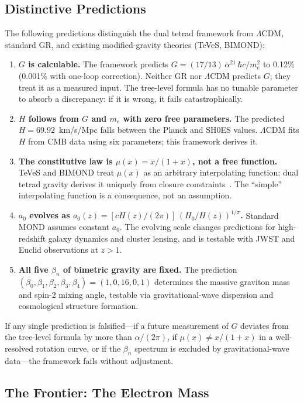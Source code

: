 \documentclass[aps,prd,preprint,superscriptaddress,showpacs,preprintnumbers,amsmath,amssymb,nofootinbib]{revtex4-2}
\begin{document}
\subsection{Distinctive Predictions}
\label{subsec:predictions}

The following predictions distinguish the dual tetrad framework from $\Lambda$CDM, standard GR, and existing modified-gravity theories (TeVeS, BIMOND):
\begin{enumerate}[leftmargin=2em]
\item \textbf{$G$ is calculable.} The framework predicts $G = (17/13)\,\alpha^{21}\,\hbar c/m_e^2$ to 0.12\% (0.001\% with one-loop correction). Neither GR nor $\Lambda$CDM predicts $G$; they treat it as a measured input. The tree-level formula has no tunable parameter to absorb a discrepancy: if it is wrong, it fails catastrophically.
\item \textbf{$H$ follows from $G$ and $m_e$ with zero free parameters.} The predicted $H = 69.92$~km/s/Mpc falls between the Planck and SH0ES values. $\Lambda$CDM fits $H$ from CMB data using six parameters; this framework derives it.
\item \textbf{The constitutive law is $\mu(x) = x/(1+x)$, not a free function.} TeVeS and BIMOND treat $\mu(x)$ as an arbitrary interpolating function; dual tetrad gravity derives it uniquely from closure constraints~\cite{paper1}. The ``simple'' interpolating function is a consequence, not an assumption.
\item \textbf{$a_0$ evolves as $a_0(z) = [cH(z)/(2\pi)]\,(H_0/H(z))^{1/\pi}$.} Standard MOND assumes constant $a_0$. The evolving scale changes predictions for high-redshift galaxy dynamics and cluster lensing, and is testable with JWST and Euclid observations at $z > 1$.
\item \textbf{All five $\beta_n$ of bimetric gravity are fixed.} The prediction $(\beta_0,\beta_1,\beta_2,\beta_3,\beta_4) = (1,0,16,0,1)$ determines the massive graviton mass and spin-2 mixing angle, testable via gravitational-wave dispersion and cosmological structure formation.
\end{enumerate}
If any single prediction is falsified---if a future measurement of $G$ deviates from the tree-level formula by more than $\alpha/(2\pi)$, if $\mu(x) \neq x/(1+x)$ in a well-resolved rotation curve, or if the $\beta_n$ spectrum is excluded by gravitational-wave data---the framework fails without adjustment.

\subsection{The Frontier: The Electron Mass}
\label{subsec:frontier}
\end{document}
